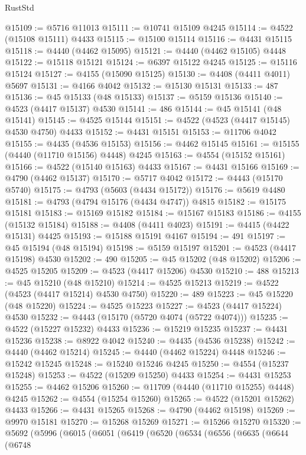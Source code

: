 \begin{lexlean}{RustStd}
\begin{coremodule}
{\begin{coremodule}
{{{{{{{{{{{{{{{{{{{{{{{{{{{{{{{{{{{{{{{{{{{{{{{{{{{{{{{{{{{{@15109 := @5716 @11013
@15111 := @10741 @15109 @4245
@15114 := @4522 (@15108 @15111) @4433
@15115 := @15100 @15114
@15116 := @4431 @15115
@15118 := @4440 (@4462 @15095)
@15121 := @4440 (@4462 @15105) @4448
@15122 := @15118 @15121
@15124 := @6397 @15122 @4245
@15125 := @15116 @15124
@15127 := @4155 (@15090 @15125)
@15130 := @4408 (@4411 @4011) @5697
@15131 := @4166 @4042
@15132 := @15130 @15131
@15133 := 487
@15136 := @45 @15133 (@48 @15133)
@15137 := @5159 @15136
@15140 := @4523 (@4417 @15137) @4530
@15141 := 486
@15144 := @45 @15141 (@48 @15141)
@15145 := @4525 @15144
@15151 := @4522 (@4523 (@4417 @15145) @4530 @4750) @4433
@15152 := @4431 @15151
@15153 := @11706 @4042
@15155 := @4435 (@4536 @15153)
@15156 := @4462 @15145
@15161 := @15155 (@4440 (@11710 @15156) @4448) @4245
@15163 := @4554 (@15152 @15161)
@15166 := @4522 (@15140 @15163) @4433
@15167 := @4431 @15166
@15169 := @4790 (@4462 @15137)
@15170 := @5717 @4042
@15172 := @4443 (@15170 @5740)
@15175 := @4793 (@5603 (@4434 @15172))
@15176 := @5619 @4480
@15181 := @4793 (@4794 @15176 (@4434 @4747)) @4815
@15182 := @15175 @15181
@15183 := @15169 @15182
@15184 := @15167 @15183
@15186 := @4155 (@15132 @15184)
@15188 := @4408 (@4411 @4023)
@15191 := @4415 (@4422 @15131) @4425
@15193 := @15188 @15191 @4167
@15194 := 491
@15197 := @45 @15194 (@48 @15194)
@15198 := @5159 @15197
@15201 := @4523 (@4417 @15198) @4530
@15202 := 490
@15205 := @45 @15202 (@48 @15202)
@15206 := @4525 @15205
@15209 := @4523 (@4417 @15206) @4530
@15210 := 488
@15213 := @45 @15210 (@48 @15210)
@15214 := @4525 @15213
@15219 := @4522 (@4523 (@4417 @15214) @4530 @4750)
@15220 := 489
@15223 := @45 @15220 (@48 @15220)
@15224 := @4525 @15223
@15227 := @4523 (@4417 @15224) @4530
@15232 := @4443 (@15170 (@5720 @4074 (@5722 @4074)))
@15235 := @4522 (@15227 @15232) @4433
@15236 := @15219 @15235
@15237 := @4431 @15236
@15238 := @8922 @4042
@15240 := @4435 (@4536 @15238)
@15242 := @4440 (@4462 @15214)
@15245 := @4440 (@4462 @15224) @4448
@15246 := @15242 @15245
@15248 := @15240 @15246 @4245
@15250 := @4554 (@15237 @15248)
@15253 := @4522 (@15209 @15250) @4433
@15254 := @4431 @15253
@15255 := @4462 @15206
@15260 := @11709 (@4440 (@11710 @15255) @4448) @4245
@15262 := @4554 (@15254 @15260)
@15265 := @4522 (@15201 @15262) @4433
@15266 := @4431 @15265
@15268 := @4790 (@4462 @15198)
@15269 := @9970 @15181
@15270 := @15268 @15269
@15271 := @15266 @15270
@15320 := @5692
    (@5996
      (@6015
        (@6051
          (@6419
            (@6520
              (@6534
                (@6556
                  (@6635
                    (@6644
                      (@6748
}}}}}}}}}}}}}}}}}}}}}}}}}}}}}}}}}}}}}}}}}}}}}}}}}}}}}}}}}}}}
\end{coremodule}}
\end{coremodule}
\end{lexlean}
